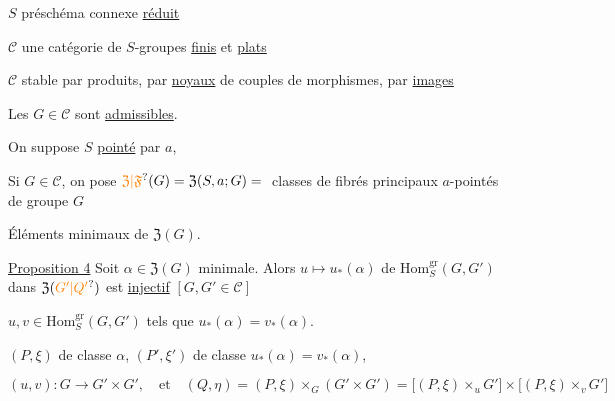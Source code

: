 $S$ \deleted{\unsure{$/$}} préschéma connexe \uline{réduit}




$\mathscr{C}$ une catégorie de $S$-groupes \uline{finis} et \uline{plats}

$\mathscr{C}$ stable par produits,  par \uline{noyaux}  de couples de morphismes, par \uline{images}

Les $G\in\mathscr{C}$ sont \uline{admissibles}.

On  suppose $S$ \uline{pointé} par $a$,

Si $G\in\mathscr{C}$, on pose $\unsure{\mathfrak{Z}|\mathfrak{F}}(G)=\mathfrak{Z}(S,a;G)={}$ classes de fibrés  principaux $a$-pointés de groupe $G$

Éléments minimaux de $\mathfrak{Z}(G)$.

\uline{Proposition 4} Soit $\alpha\in\mathfrak{Z}(G)$ minimale. Alors $u\mapsto u_*(\alpha)$ de $\mathrm{Hom}^{\mathrm{gr}}_S(G,G')$ dans $\mathfrak{Z}(\unsure{G'|Q'})$ est \uline{injectif} \hfill $[G,G'\in\mathscr{C}]$

$u,v\in\mathrm{Hom}^{\mathrm{gr}}_S(G,G')$ tels que  $u_*(\alpha)=v_*(\alpha)$.

$(P,\xi)$ de classe $\alpha$, $(P',\xi')$ de classe $u_*(\alpha)=v_*(\alpha)$,

\[
(u,v):G\longrightarrow G'\times G',\quad \text{et}\quad
(Q,\eta)=(P,\xi)\mathop{\times}_{G}(G'\times G')
=\big[(P,\xi)\mathop{\times}_{u}G'\big]\times\big[(P,\xi)\mathop{\times}_{v}G'\big]
\]


